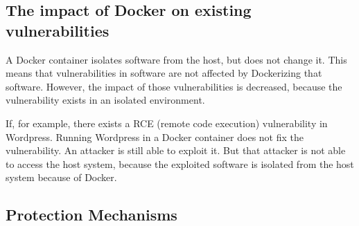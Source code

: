 \subsection{The impact of Docker on existing vulnerabilities}
A Docker container isolates software from the host, but does not change it. This means that vulnerabilities in software are not affected by Dockerizing that software. However, the impact of those vulnerabilities is decreased, because the vulnerability exists in an isolated environment.

If, for example, there exists a RCE (remote code execution) vulnerability in Wordpress. Running Wordpress in a Docker container does not fix the vulnerability. An attacker is still able to exploit it. But that attacker is not able to access the host system, because the exploited software is isolated from the host system because of Docker.

\subsection{Protection Mechanisms}
